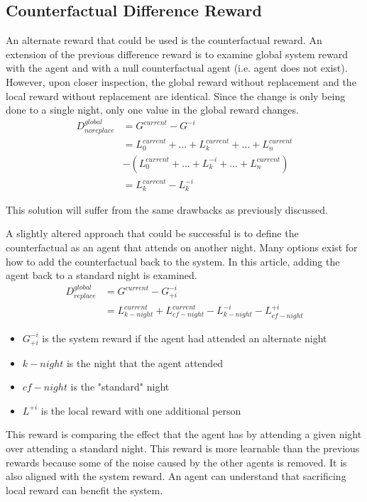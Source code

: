 \documentclass[letterpaper, 10 pt, conference]{ieeeconf}
\begin{document}
\subsection{Counterfactual Difference Reward}
An alternate reward that could be used is the counterfactual reward.  An extension of the previous difference reward is to examine global system reward with the agent and with a null counterfactual agent (i.e. agent does not exist).  However, upon closer inspection, the global reward without replacement and the local reward without replacement are identical.  Since the change is only being done to a single night, only one value in the global reward changes.
\begin{equation}
\begin{aligned}
    D^{global}_{no replace} &= G^{current} - G^{-i} \\
    &= L^{current}_0 + ... + L^{current}_k + ... + L^{current}_n \\
     &- (L^{current}_0 + ... + L^{-i}_{k} + ... + L^{current}_n) \\
    &= L^{current}_k - L^{-i}_k
\end{aligned}
\end{equation}

This solution will suffer from the same drawbacks as previously discussed.

A slightly altered approach that could be successful is to define the counterfactual as an agent that attends on another night.  Many options exist for how to add the counterfactual back to the system.  In this article, adding the agent back to a standard night is examined.
\begin{equation}
\begin{align}
    D^{global}_{replace} &= G^{current} - G^{-i}_{+i} \\
    &= L^{current}_{k-night} + L^{current}_{cf-night} - L^{-i}_{k-night} - L^{+i}_{cf-night}
\end{align}
\end{equation}

\begin{itemize}
    \item $G^{-i}_{+i}$ is the system reward if the agent had attended an alternate night
    \item $k-night$ is the night that the agent attended
    \item $cf-night$ is the "standard" night
    \item $L^{+i}$ is the local reward with one additional person
\end{itemize}
This reward is comparing the effect that the agent has by attending a given night over attending a standard night.  This reward is more learnable than the previous rewards because some of the noise caused by the other agents is removed.  It is also aligned with the system reward.  An agent can understand that sacrificing local reward can benefit the system.  
\end{document}
